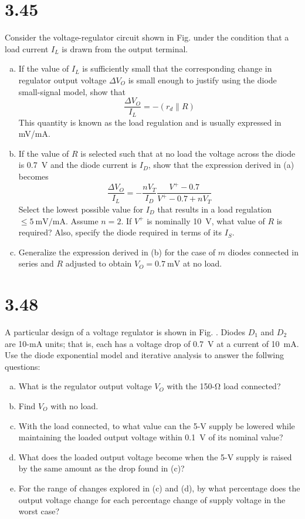 \documentclass[12pt, a4paper]{article}
\newcommand{\sima}{\milli\ampere}
\newcommand{\simv}{\milli\volt}
\newcommand{\siv}{\volt}
\theoremstyle{mystyle}	%
\begin{document}
\section{3.45}
Consider the voltage-regulator circuit shown in Fig. under the
condition that a load current $I_L$ is drawn from the output terminal.
\begin{enumerate}[(a)]
  \item If the value of $I_L$ is sufficiently small that the
    corresponding change in regulator output voltage $\Delta V_O$ is
    small enough to justify using the diode small-signal model, show
    that
    \[ \frac{\Delta V_O}{I_L} = -(r_d \parallel R) \]
    This quantity is known as the load regulation and is usually
    expressed in \si{\simv/\sima}.
  \item If the value of $R$ is selected such that at no load the voltage
    across the diode is \SI{0.7}{\siv} and the diode current is $I_D$,
    show that the expression derived in (a) becomes
    \[ \frac{\Delta V_O}{I_L} =
      -\frac{nV_T}{I_D}\frac{V^+ -0.7}{V^+ - 0.7 + nV_T} \]
    Select the lowest possible value for $I_D$ that results in a load
    regulation $\le \SI{5}{\simv/\sima}$. Assume $n = 2$.
    If $V^+$ is nominally \SI{10}{\siv}, what value of $R$ is required?
    Also, specify the diode required in terms of its $I_S$.
  \item Generalize the expression derived in (b) for the case of $m$
    diodes connected in series and $R$ adjusted to obtain $V_O =
    \SI{0.7}{\simv}$ at no load.
\end{enumerate}

\section{3.48}
A particular design of a voltage regulator is shown in Fig. .
Diodes $D_1$ and $D_2$ are 10-\si{\sima} units; that is,
each has a voltage drop of \SI{0.7}{\siv} at a current of
\SI{10}{\sima}. Use the diode exponential model and iterative
analysis to answer the follwing questions:
\begin{enumerate}[(a)]
  \item What is the regulator output voltage $V_O$ with the
    150-\si{\ohm} load connected?
  \item Find $V_O$ with no load.
  \item With the load connected, to what value can the 5-\si{\siv}
    supply be lowered while maintaining the loaded output voltage
    within \SI{0.1}{\siv} of its nominal value?
  \item What does the loaded output voltage become when the 5-\si{\siv}
    supply is raised by the same amount as the drop found in (c)?
  \item For the range of changes explored in (c) and (d), by what
    percentage does the output voltage change for each percentage
    change of supply voltage in the worst case?
\end{enumerate}
\end{document}
